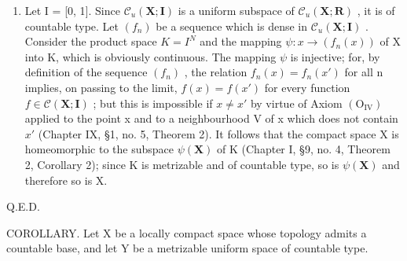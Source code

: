 \begin{enumerate}
\item
  Let I = {[}0, 1{]}. Since \(\mathcal{C}_{u}(\mathbf{X};\mathbf{I})\) is a uniform subspace of \(\mathcal{C}_{u}(\mathbf{X};\mathbf{R})\) , it is of countable type. Let \((f_{n})\) be a sequence which is dense in \(\mathcal{C}_{u}(\mathbf{X};\mathbf{I})\) . Consider the product space \(K=I^{N}\) and the mapping \(\psi: x\to(f_{n}(x))\) of X into K, which is obviously continuous. The mapping \(\psi\) is injective; for, by definition of the sequence \((f_{n})\) , the relation \(f_{n}(x)=f_{n}(x')\) for all n implies, on passing to the limit, \(f(x)=f(x')\) for every function \(f\in\mathcal{C}(\mathbf{X};\mathbf{I})\) ; but this is impossible if \(x\neq x'\) by virtue of Axiom \((\mathrm{O}_{\mathrm{IV}})\) applied to the point x and to a neighbourhood V of x which does not contain \(x'\) (Chapter IX, §1, no. 5, Theorem 2). It follows that the compact space X is homeomorphic to the subspace \(\psi(\mathbf{X})\) of K (Chapter I, §9, no. 4, Theorem 2, Corollary 2); since K is metrizable and of countable type, so is \(\psi(\mathbf{X})\) and therefore so is X.
\end{enumerate}

Q.E.D.

COROLLARY. Let X be a locally compact space whose topology admits a countable base, and let Y be a metrizable uniform space of countable type.

